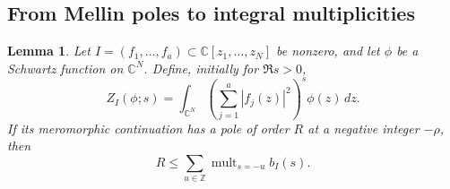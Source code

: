 \documentclass[11pt,a4paper]{article}
\numberwithin{equation}{section}
\newtheorem{lemma}[theorem]{Lemma}
\theoremstyle{definition}
\newcommand{\C}{\mathbb C}
\newcommand{\Z}{\mathbb Z}
\DeclareMathOperator{\mult}{mult}
\begin{document}
\subsection{From Mellin poles to integral multiplicities}\label{subsec:polebound}

\begin{lemma}\label{lem:polebound}
Let $I=(f_1,\ldots,f_a)\subset\C[z_1,\ldots,z_N]$ be nonzero,
and let $\phi$ be a Schwartz function on $\C^N$.
Define, initially for $\Re s>0$,
\[
Z_I(\phi;s)=\int_{\C^N}\left(\sum_{j=1}^a|f_j(z)|^2\right)^s
                         \phi(z)\,dz.
\]
If its meromorphic continuation has a pole of order $R$ at a negative
integer $-\rho$, then
\begin{equation}\label{eq:totalpolebound}
R\le\sum_{u\in\Z}\mult_{s=-u}b_I(s).
\end{equation}
\end{lemma}
\end{document}
